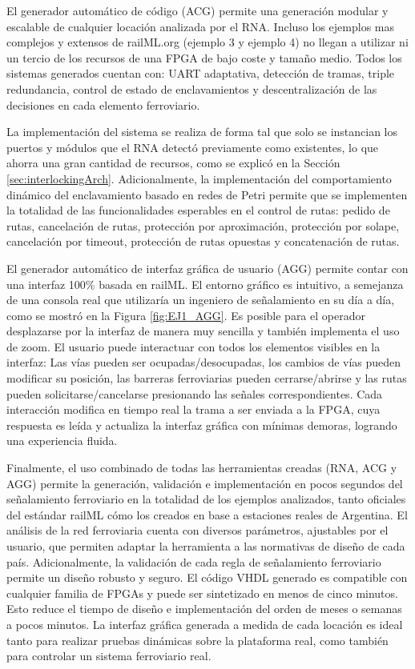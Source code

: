 El generador automático de código (ACG) permite una generación modular y escalable de cualquier locación analizada por el RNA. Incluso los ejemplos mas complejos y extensos de railML.org (ejemplo 3 y ejemplo 4) no llegan a utilizar ni un tercio de los recursos de una FPGA de bajo coste y tamaño medio. Todos los sistemas generados cuentan con: UART adaptativa, detección de tramas, triple redundancia, control de estado de enclavamientos y descentralización de las decisiones en cada 
elemento ferroviario.

La implementación del sistema se realiza de forma tal que solo se instancian los puertos y módulos que el RNA detectó previamente como existentes, lo que ahorra una gran cantidad de recursos, como se explicó en la Sección \ref{sec:interlockingArch}. Adicionalmente, la implementación del comportamiento dinámico del enclavamiento basado en redes de Petri permite que se implementen la totalidad de las funcionalidades esperables en el control de rutas: pedido de rutas, cancelación de rutas, protección por aproximación, protección por solape, cancelación por timeout, protección de rutas opuestas y concatenación de rutas.

El generador automático de interfaz gráfica de usuario (AGG) permite contar con una interfaz 100\% basada en railML. El entorno gráfico es intuitivo, a semejanza de una consola real que utilizaría un ingeniero de señalamiento en su día a día, como se mostró en la Figura \ref{fig:EJ1_AGG}. Es posible para el operador desplazarse por la interfaz de manera muy sencilla y también implementa el uso de zoom. El usuario puede interactuar con todos los elementos visibles en la interfaz: Las vías pueden ser ocupadas/desocupadas, los cambios de vías pueden modificar su posición, las barreras ferroviarias pueden cerrarse/abrirse y las rutas pueden solicitarse/cancelarse presionando las señales correspondientes. Cada interacción modifica en tiempo real la trama a ser enviada a la FPGA, cuya respuesta es leída y actualiza la interfaz gráfica con mínimas demoras, logrando una experiencia fluida.

Finalmente, el uso combinado de todas las herramientas creadas (RNA, ACG y AGG) permite la generación, validación e implementación en pocos segundos del señalamiento ferroviario en la totalidad de los ejemplos analizados, tanto oficiales del estándar railML cómo los creados en base a estaciones reales de Argentina. El análisis de la red ferroviaria cuenta con diversos parámetros, ajustables por el usuario, que permiten adaptar la herramienta a las normativas de diseño de cada país. Adicionalmente, la validación de cada regla de señalamiento ferroviario permite un diseño robusto y seguro. El código VHDL generado es compatible con cualquier familia de FPGAs y puede ser sintetizado en menos de cinco minutos. Esto reduce el tiempo de diseño e implementación del orden de meses o semanas a pocos minutos. La interfaz gráfica generada a medida de cada locación es ideal tanto para realizar pruebas dinámicas sobre la plataforma real, como también para controlar un sistema ferroviario real.

